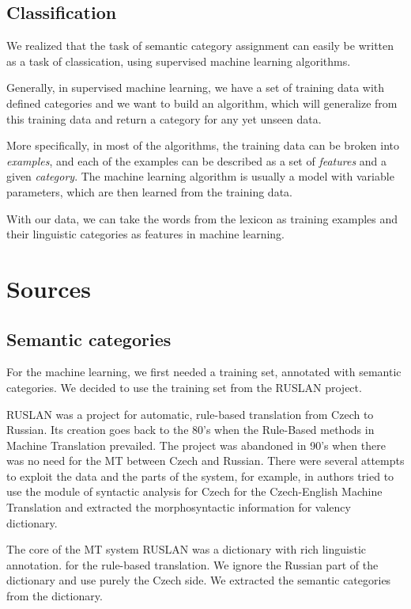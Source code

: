 \documentclass[letterpaper]{article}
\newcommand{\todofn}[1] {
 \footnote{\textbf{TODO : #1}}}
\begin{document}
\subsection{Classification}
We realized that the task of semantic category assignment can easily be written as a task of classication, 
using supervised machine learning algorithms.

Generally, in supervised machine learning, we have a set of training data with defined 
categories and we want to build an algorithm, which will generalize from this training data and return a category for any yet unseen data.

More specifically, in most of the algorithms, the training data can be broken into
\textit{examples}, and each of the examples can be described as a set of \textit{features} and a given \textit{category}. The machine learning algorithm is usually a model with variable parameters, which are then learned from the training data.


With our data, we can take the words from the lexicon as training examples 
and their linguistic categories as features in machine learning.



\section{Sources}
\subsection{Semantic categories}
For the machine learning, we first needed a training set, annotated with semantic categories. 
We decided to use the training set from the RUSLAN project.


RUSLAN was a project for automatic, rule-based translation from Czech to Russian. 
Its creation \cite{oliva1989parser} goes back to the 80's when the Rule-Based 
methods in Machine Translation prevailed.  The project was abandoned in 90's when
there was no need for the MT between Czech and Russian. There were
several attempts to exploit the data and the parts of the system, for
example, in \cite{mt-recycled} authors tried to use the module
of syntactic analysis for Czech for the Czech-English Machine Translation
and \cite{pisa2010} extracted the morphosyntactic information for
valency dictionary.

The core of the MT system RUSLAN was a dictionary with rich linguistic annotation.
for the rule-based translation. We ignore the Russian 
part of the dictionary and use purely the Czech side. We extracted the 
semantic categories from the dictionary. 
\end{document}
